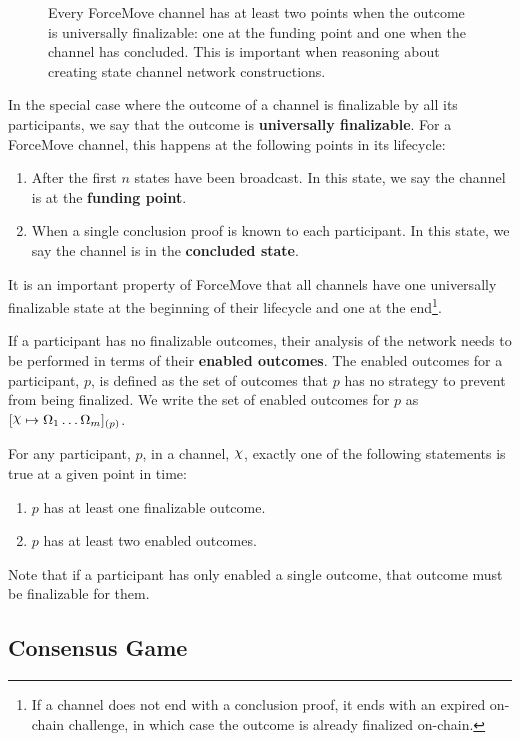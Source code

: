 \begin{figure}[h]\centering
  \makebox[\textwidth][c]{}
  \caption{
    Every ForceMove channel has at least two points when the outcome is universally finalizable: one at the funding point and one when the channel has concluded.
    This is important when reasoning about creating state channel network constructions.
  }
\end{figure}
In the special case where the outcome of a channel is finalizable by all its participants, we say that the outcome is \textbf{universally finalizable}.
For a ForceMove channel, this happens at the following points in its lifecycle:
\begin{enumerate}
  \item After the first $n$ states have been broadcast. In this state, we say the channel is at the \textbf{funding point}.
  \item When a single conclusion proof is known to each participant. In this state, we say the channel is in the \textbf{concluded state}.
\end{enumerate}
It is an important property of ForceMove that all channels have one universally finalizable
state at the beginning of their lifecycle and one at the end\footnote{If a channel does not end with a conclusion proof, it ends with an expired on-chain challenge,
in which case the outcome is already finalized on-chain.}.

If a participant has no finalizable outcomes, their analysis of the network needs to be performed
in terms of their \textbf{enabled outcomes}.
The enabled outcomes for a participant, $p$, is defined as the set of outcomes that $p$ has
no strategy to prevent from being finalized.
We write the set of enabled outcomes for $p$ as $\finalizable{\rchi}{\Omega_1 \dots \Omega_m}{(p)}$.

For any participant, $p$, in a channel, $\rchi$, exactly one of the following statements is
true at a given point in time:
\begin{enumerate}
  \item $p$ has at least one finalizable outcome.
  \item $p$ has at least two enabled outcomes.
\end{enumerate}
Note that if a participant has only enabled a single outcome, that outcome must be finalizable for them.

\subsection{Consensus Game}

